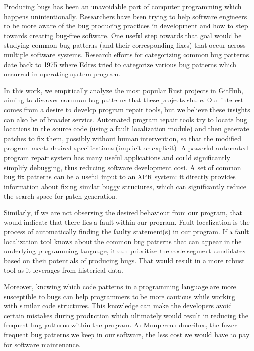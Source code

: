 Producing bugs has been an unavoidable part of computer programming which happens unintentionally. Researchers have been trying to help software engineers to be more aware of the bug producing practices in development and how to step towards creating bug-free software. One useful step towards that goal would be studying common bug patterns (and their corresponding fixes) that occur across multiple software systems. Research efforts for categorizing common bug patterns date back to 1975 where Edres tried to categorize various bug patterns which occurred in operating system program. 

In this work, we empirically analyze the most popular Rust projects in GitHub, aiming to discover common bug patterns that these projects share. Our interest comes from a desire to develop program repair tools, but we believe these insights can also be of broader service. Automated program repair tools try to locate bug locations in the source code (using a fault localization module) and then generate patches to fix them, possibly without human intervention, so that the modified program meets desired specifications (implicit or explicit). A powerful automated program repair system has many useful applications and could significantly simplify debugging, thus reducing software development cost. A set of common bug fix patterns can be a useful input to an APR system: it directly provides information about fixing similar buggy structures, which can significantly reduce the search space for patch generation. 

Similarly, if we are not observing the desired behaviour from our program, that would indicate that there lies a fault within our program. Fault localization is the process of automatically finding the faulty statement(s) in our program. If a fault localization tool knows about the common bug patterns that can appear in the underlying programming language, it can prioritize the code segment candidates based on their potentials of producing bugs. That would result in a more robust tool as it leverages from historical data.

Moreover, knowing which code patterns in a programming language are more susceptible to bugs can help programmers to be more cautious while working with similar code structures. This knowledge can make the developers avoid certain mistakes during production which ultimately would result in reducing the frequent bug patterns within the program. As Monperrus describes, the fewer frequent bug patterns we keep in our software, the less cost we would have to pay for software maintenance.

